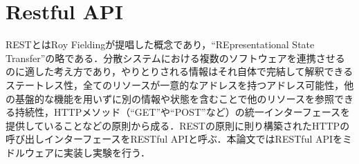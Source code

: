 \documentclass[a4paper,11pt]{ujreport}
\begin{document}
\section{Restful API}
RESTとはRoy Fieldingが提唱した概念であり\cite{fielding2000architectural}，“REpresentational State Transfer”の略である．分散システムにおける複数のソフトウェアを連携させるのに適した考え方であり，やりとりされる情報はそれ自体で完結して解釈できるステートレス性，全てのリソースが一意的なアドレスを持つアドレス可能性，他の基盤的な機能を用いずに別の情報や状態を含むことで他のリソースを参照できる持続性，HTTPメソッド（“GET”や“POST”など）の統一インターフェースを提供していることなどの原則から成る．RESTの原則に則り構築されたHTTPの呼び出しインターフェースをRESTful APIと呼ぶ．本論文ではRESTful APIをミドルウェアに実装し実験を行う．
\end{document}
